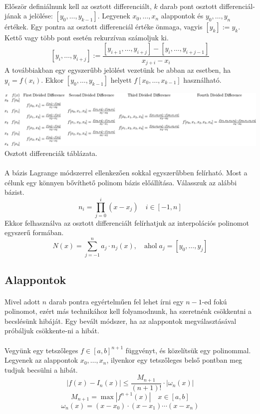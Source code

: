 \documentclass{elteikthesis}
\begin{document}
\paragraph{}
Először definiálnunk kell az osztott differenciált, $k$ darab pont osztott differenciál-jának a jelölése: $[y_0, \dots, y_{k-1}]$. Legyenek $x_0, \dots, x_n$ alappontok és $y_0, \dots, y_n$ értékek. Egy pontra az osztott differenciál értéke önmaga, vagyis $[y_k] := y_k$. Kettő vagy több pont esetén rekurzívan számoljuk ki.
$$[y_i, \dots, y_{i+j}] := \frac{[y_{i+1}, \dots, y_{i+j}] - [y_{i}, \dots, y_{i+j-1}]}{x_{j+i} - x_i}$$
A továbbiakban egy egyszerűbb jelölést vezetünk be abban az esetben, ha $y_i = f(x_i)$. Ekkor $[y_0, \dots, y_{k-1}]$ helyett $f[x_0, \dots, x_{k-1}]$ használható.
\begin{center}
\includegraphics[width=15cm]{pics/divide_difference_table}\\
{\footnotesize Osztott differenciák táblázata.}
\end{center}
\paragraph{}
A bázis Lagrange módszerrel ellenkezően sokkal egyszerűbben felírható. Most a célunk egy könnyen bővíthető polinom bázis előállítása. Válasszuk az alábbi bázist. $$n_i = \prod_{j = 0}^{i}(x-x_j) \quad i \in [-1, n]$$
Ekkor felhasználva az osztott differenciált felírhatjuk az interpolációs polinomot egyszerű formában.
$$N(x) = \sum_{j=-1}^{n}a_j \cdot n_j(x), \quad \mbox{ahol} \; a_j = [y_0, \dots ,y_j]$$
\subsection{Alappontok}
\paragraph{}
Mivel adott $n$ darab pontra egyértelműen fel lehet írni egy $n-1$-ed fokú polinomot, ezért más technikához kell folyamodnunk, ha szeretnénk csökkentni a becslésünk hibáját. Egy bevált módszer, ha az alappontok megválasztásával próbáljuk csökkente-ni a hibát.
\paragraph{}
Vegyünk egy tetszőleges $f \in [a,b]^{n+1}$ függvényt, és közelítsük egy polinommal. Legyenek az alappontok $x_0, \dots, x_n$, ilyenkor egy tetszőleges belső pontban meg tudjuk becsülni a hibát. $$|f(x) - I_n(x)| \leq \frac{M_{n+1}}{(n+1)!} \cdot |\omega_n(x)|$$
$$M_{n+1} = \max |f^{n+1}(x)| \quad x \in [a,b]$$
$$\omega_n(x) = (x-x_0)\cdot(x-x_1)\cdots(x-x_n)$$
\end{document}
